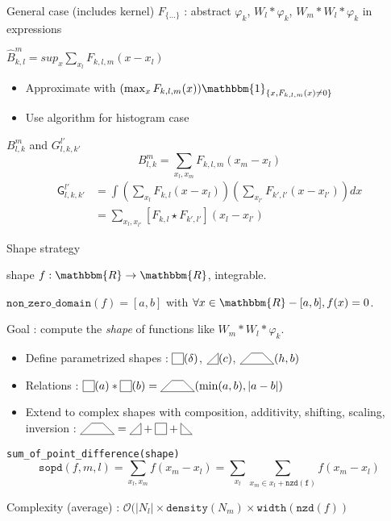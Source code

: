 \documentclass{beamer}
\newcommand\SymSquare{\begin{tikzpicture}[baseline=0.5ex]%
        \draw (0,0) -- (0,1em) -- (1em,1em) -- (1em,0) -- cycle;
\end{tikzpicture}}
\newcommand\Indicator[1]{\SymSquare(#1)}
\newcommand\SymPositiveTriangle{\begin{tikzpicture}[baseline=0.5ex]%
        \draw (0,0) -- (1em,0em) -- (1em,1em) -- cycle;
\end{tikzpicture}}
\newcommand\PositiveTriangle[1]{\SymPositiveTriangle(#1)}
\newcommand\SymNegativeTriangle{\begin{tikzpicture}[baseline=0.5ex]%
        \draw (0,0) -- (0,1em) -- (1em,0em) -- cycle;
\end{tikzpicture}}
\newcommand\SymTrapezoid{\begin{tikzpicture}[baseline=0.5ex]%
        \draw (0,0) -- (3em,0) -- (2em,1em) -- (1em,1em) -- cycle;
\end{tikzpicture}}
\newcommand\Trapezoid[2]{\SymTrapezoid(#1,#2)}%
\newcommand\Convolution{\ast}
\newcommand\Correlation{\star}
\begin{document}
\begin{frame}{General case (includes kernel)}
    $F_{\{\ldots\}}$ : abstract $\varphi_k$,  $W_l \Convolution \varphi_k$, $W_m \Convolution W_l \Convolution \varphi_k$ in expressions
    \begin{block}
        {$\hat{B}_{k,l}^m = sup_x \sum_{x_l} F_{k,l,m}(x - x_l)$}
        \begin{itemize}
            \item Approximate with $(\max_x F_{k,l,m}(x)) \mathbbm{1}_{\{x, F_{k,l,m}(x) \ne 0\}}$
            \item Use algorithm for histogram case
        \end{itemize}
    \end{block}
    \begin{block}{$B_{l,k}^m$ and $G_{l,k,k'}^{l'}$}
        \[ B_{l,k}^m = \sum_{x_l,x_m} F_{k,l,m} (x_m - x_l) \]
        \[ \begin{split}
                \mathsf{G}_{l,k,k'}^{l'} &= \int (\sum_{x_l} F_{k,l} (x - x_l)) (\sum_{x_{l'}} F_{k',l'} (x - x_{l'})) dx \\
                &= \sum_{x_l,x_{l'}} [F_{k,l} \Correlation F_{k',l'}] (x_l - x_{l'})
        \end{split} \]
    \end{block}
\end{frame}

\begin{frame}{Shape strategy}
    \begin{block}{shape}
        $f : \mathbbm{R} \rightarrow \mathbbm{R}$, integrable.

        $\mathtt{non\_zero\_domain}(f) = [a, b]$ with $\forall x \in \mathbbm{R} - [a,b], f(x) = 0$.

        Goal : compute the \emph{shape} of functions like $W_m \Convolution W_l \Convolution \varphi_k$.
        \begin{itemize}
            \item Define parametrized shapes : $\Indicator{\delta}$, $\PositiveTriangle{c}$, $\Trapezoid{h}{b}$
            \item Relations : $\Indicator{a} \Convolution \Indicator{b} = \Trapezoid{\min(a,b)}{|a - b|}$
            \item Extend to complex shapes with composition, additivity, shifting, scaling, inversion : $\SymTrapezoid = \SymPositiveTriangle + \SymSquare + \SymNegativeTriangle$
        \end{itemize}
    \end{block}
    \begin{block}{\texttt{sum\_of\_point\_difference(shape)}}
        \[ \mathtt{sopd}(f,m,l) = \sum_{x_l,x_m} f(x_m - x_l) = \sum_{x_l} \sum_{x_m \in x_l + \mathtt{nzd(f)}} f(x_m - x_l) \]

        Complexity (average) : $\mathcal{O}( |N_l| \times \mathtt{density}(N_m) \times \mathtt{width}(\mathtt{nzd}(f))$
    \end{block}
\end{frame}
\end{document}
